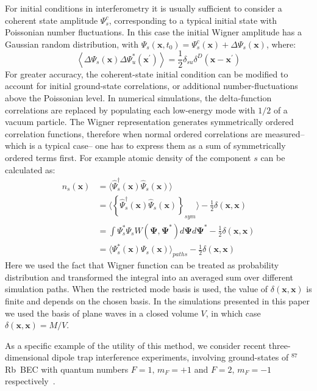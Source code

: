 \documentclass[aps,prl,twocolumn,showpacs,amsmath,amssymb,superscriptaddress]{revtex4-1}
\newcommand{\Rb}{$^{87}$Rb}
\newcommand{\xvec}{\boldsymbol{x}}
\newcommand{\Psivec}{\boldsymbol{\Psi}}
\begin{document}
For initial conditions in interferometry it is usually sufficient
to consider a coherent state amplitude $\Psi_{s}^{c}$,
corresponding to a typical initial state with Poissonian number fluctuations.
In this case the initial Wigner amplitude has a Gaussian random distribution,
with $\Psi_{s}(\xvec,t_{0})=\Psi_{s}^{c}(\xvec)+\Delta\Psi_{s}(\xvec)$,
where:
\begin{equation}
	\left\langle
		\Delta\Psi_{s}(\xvec) \Delta\Psi_{u}^{*}(\xvec^\prime)
	\right\rangle =
	\frac{1}{2} \delta_{su} \delta^{D} \left( \xvec - \xvec^\prime\right)
\end{equation}
For greater accuracy, the coherent-state initial condition
can be modified to account for initial ground-state correlations,
or additional number-fluctuations above the Poissonian level.
In numerical simulations, the delta-function correlations are replaced by
populating each low-energy mode with $1/2$ of a vacuum particle.
The Wigner representation generates symmetrically ordered correlation functions,
therefore when normal ordered correlations are measured\---which is a typical case\---
one has to express them as a sum of symmetrically ordered terms first.
For example atomic density of the component $s$ can be calculated as:
\begin{equation}
\begin{split}
n_{s} (\xvec) & =
\langle \widehat{\Psi}^\dagger_{s} (\xvec) \widehat{\Psi}_{s} (\xvec) \rangle \\
& = \langle \left\{ \widehat{\Psi}^\dagger_{s} (\xvec)
	\widehat{\Psi}_{s} (\xvec) \right\}_{sym} \rangle -
	\frac{1}{2} \delta(\xvec, \xvec) \\
& = \int \Psi^*_{s} \Psi_{s} W(\Psivec, \Psivec^*) d\Psivec d\Psivec^* -
	\frac{1}{2} \delta(\xvec, \xvec) \\
& = \langle \Psi^*_{s} (\xvec) \Psi_{s} (\xvec) \rangle_{paths} - \frac{1}{2} \delta(\xvec, \xvec)
\end{split}
\end{equation}
Here we used the fact that Wigner function can be treated as probability distribution
and transformed the integral into an averaged sum over different simulation paths.
When the restricted mode basis is used, the value of $\delta(\xvec, \xvec)$ is finite
and depends on the chosen basis.
In the simulations presented in this paper we used the basis of plane waves in a closed volume $V$,
in which case $\delta(\xvec, \xvec) = M / V$.

As a specific example of the utility of this method,
we consider recent three-dimensional dipole trap interference experiments,
involving ground-states of \Rb~BEC with quantum numbers $F=1,\, m_{F}=+1$
and $F=2,\, m_{F}=-1$ respectively~\cite{Egorov2010}.
\end{document}
